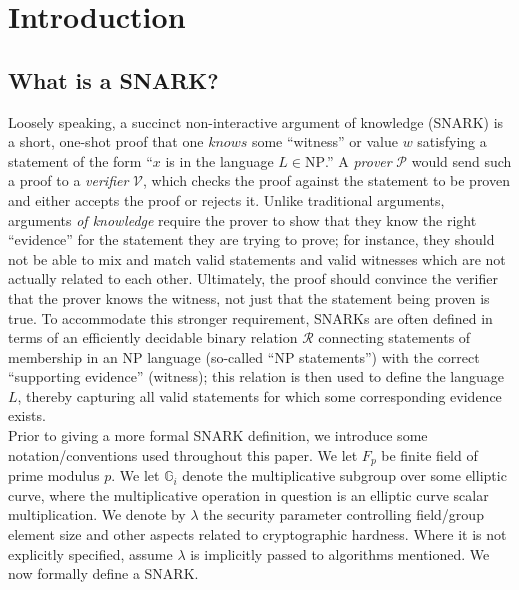\section{Introduction}
\subsection{What is a SNARK?}
\noindent Loosely speaking, a succinct non-interactive argument of knowledge (SNARK) is a short, one-shot proof that one $knows$ some ``witness'' or value $w$ satisfying a statement of the form ``$x$ is in the language $L \in \text{NP}$.'' A \textit{prover} $\mathcal{P}$ would send such a proof to a \textit{verifier} $\mathcal{V}$, which checks the proof against the statement to be proven and either accepts the proof or rejects it. Unlike traditional arguments, arguments \textit{of knowledge} require the prover to show that they know the right ``evidence'' for the statement they are trying to prove; for instance, they should not be able to mix and match valid statements and valid witnesses which are not actually related to each other. Ultimately, the proof should convince the verifier that the prover knows the witness, not just that the statement being proven is true. To accommodate this stronger requirement, SNARKs are often defined in terms of an efficiently decidable binary relation $\mathcal{R}$ connecting statements of membership in an NP language (so-called ``NP statements'') with the correct ``supporting evidence'' (witness); this relation is then used to define the language $L$, thereby capturing all valid statements for which some corresponding evidence exists.\\ 

\noindent Prior to giving a more formal SNARK definition, we introduce some notation/conventions used throughout this paper. We let $F_p$ be finite field of prime modulus $p$. We let $\mathbb{G}_i$ denote the multiplicative subgroup over some elliptic curve, where the multiplicative operation in question is an elliptic curve scalar multiplication. We denote by $\lambda$ the security parameter controlling field/group element size and other aspects related to cryptographic hardness. Where it is not explicitly specified, assume $\lambda$ is implicitly passed to algorithms mentioned. We now formally define a SNARK.\\  

